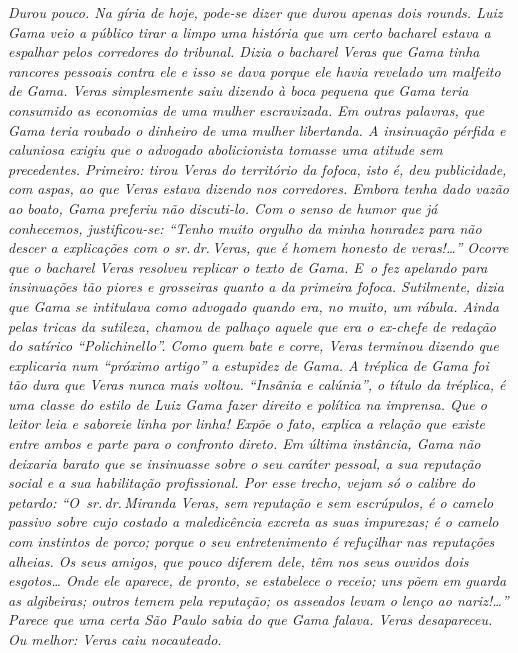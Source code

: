 \begin{didas}
\emph{Durou pouco. Na gíria de hoje, pode-se dizer que durou apenas dois
rounds. Luiz Gama veio a público tirar a limpo uma história que um certo
bacharel estava a espalhar pelos corredores do tribunal. Dizia o
bacharel Veras que Gama tinha rancores pessoais contra ele e isso se
dava porque ele havia revelado um malfeito de Gama. Veras simplesmente
saiu dizendo à boca pequena que Gama teria consumido as economias de uma
mulher escravizada. Em outras palavras, que Gama teria roubado o
dinheiro de uma mulher libertanda. A insinuação pérfida e caluniosa
exigiu que o advogado abolicionista tomasse uma atitude sem precedentes.
Primeiro: tirou Veras do território da fofoca, isto é, deu publicidade,
com aspas, ao que Veras estava dizendo nos corredores. Embora tenha dado
vazão ao boato, Gama preferiu não discuti-lo. Com o senso de humor que
já conhecemos, justificou-se: ``Tenho muito orgulho da minha honradez
para não descer a explicações com o sr.\,dr.\,Veras, que é homem honesto
de veras!\ldots{}'' Ocorre que o bacharel Veras resolveu replicar o texto de
Gama. E~o fez apelando para insinuações tão piores e grosseiras quanto a
da primeira fofoca. Sutilmente, dizia que Gama se intitulava como
advogado quando era, no muito, um rábula. Ainda pelas tricas da
sutileza, chamou de palhaço aquele que era o ex-chefe de redação do
satírico ``Polichinello''. Como quem bate e corre, Veras terminou
dizendo que explicaria num ``próximo artigo'' a estupidez de Gama. A
tréplica de Gama foi tão dura que Veras nunca mais voltou. ``Insânia e
calúnia'', o título da tréplica, é uma classe do estilo de Luiz
Gama fazer direito e política na imprensa. Que o leitor leia e saboreie
linha por linha! Expõe o fato, explica a relação que existe entre ambos
e parte para o confronto direto. Em última instância, Gama não deixaria
barato que se insinuasse sobre o seu caráter pessoal, a sua reputação
social e a sua habilitação profissional. Por esse trecho, vejam só o
calibre do petardo: ``O~sr.\,dr.\,Miranda Veras, sem reputação e sem
escrúpulos, é o camelo passivo sobre cujo costado a maledicência excreta
as suas impurezas; é o camelo com instintos de porco; porque o seu
entretenimento é refuçilhar nas reputações alheias. Os seus amigos, que
pouco diferem dele, têm nos seus ouvidos dois esgotos\ldots{} Onde ele
aparece, de pronto, se estabelece o receio; uns põem em guarda as
algibeiras; outros temem pela reputação; os asseados levam o lenço ao
nariz!\ldots{}'' Parece que uma certa São Paulo sabia do que Gama falava.
Veras desapareceu. Ou melhor: Veras caiu nocauteado. }
\end{didas}

